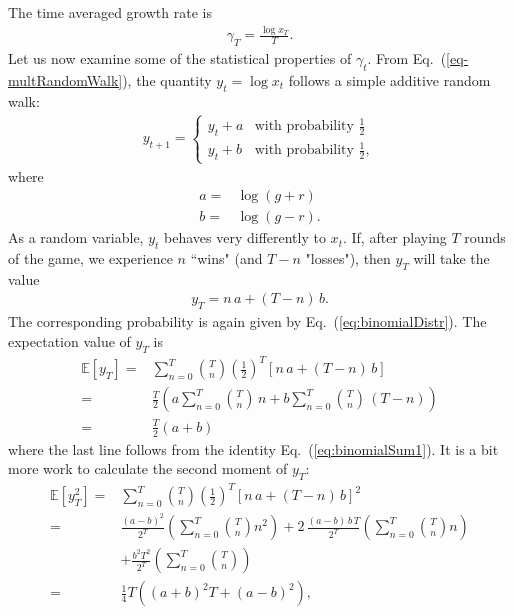 \documentclass[11pt]{article}
\begin{document}
\begin{multicols}{2}
The time averaged growth rate is
\begin{align}
\label{eq:gammaT}
\gamma_T = \frac{\log x_T}{T}.
\end{align}
Let us now examine some of the statistical properties of $\gamma_t$.
From Eq.~(\ref{eq-multRandomWalk}), the quantity $y_t = \log x_t$ follows a simple additive random walk:
\begin{align}
\label{eq-addRandomWalk}
y_{t+1} = \left\{ 
\begin{array}{ll}
y_t + a& \text{with probability $\frac{1}{2}$}\\
y_t + b  & \text{with probability $\frac{1}{2}$},
\end{array}
\right.
\end{align}
where 
\begin{align*}
a =& \log (g+r)\\
b = & \log (g-r). 
\end{align*}
As a random variable, $y_t$ behaves very differently to $x_t$.  If, after playing $T$ rounds of the game, we experience $n$ ``wins" (and $T-n$ "losses"), then $y_T$ will take the value
\begin{align*}
y_T =  n\, a + (T-n)\,b.
\end{align*}
The corresponding probability is again given by Eq.~(\ref{eq:binomialDistr}). 
The expectation value of $y_T$ is 
\begin{align}
\nonumber \mathbb{E}\left[y_T \right] =& \sum_{n=0}^T  {T \choose n} \left(\frac{1}{2}\right)^T  \left[ n\, a + (T-n)\,b \right] \\
\nonumber  = & \frac{T}{2} \left( a \sum_{n=0}^T {T \choose n} \,n + b \sum_{n=0}^T {T \choose n} \,(T-n)\right)\\
\label{eq-expectationyT}=&  \frac{T}{2} \left(a  + b \right)
\end{align}
where the last line follows from the identity Eq.~(\ref{eq:binomialSum1}).
It is a bit more work to calculate the second moment of $y_T$:
\begin{align}
\nonumber \mathbb{E}\left[y_T^2 \right] =& \sum_{n=0}^T  {T \choose n} \left(\frac{1}{2}\right)^T  \left[ n\, a + (T-n)\,b \right] ^2\\
\nonumber =& \frac{(a-b)^2}{2^T}\left( \sum_{n=0}^T  {T \choose n} n^2 \right) +  2\, \frac{(a - b)\, b\, T}{2^T} \left(\sum_{n=0}^T  {T \choose n} n \right) \\
\nonumber &  + \frac{b^2 T^2}{2^T} \left( \sum_{n=0}^T  {T \choose n} \right) \\ 
\label{eq:varianceyT} = & \frac{1}{4} T \left( (a + b)^2 T  + (a-b)^2\right),

\end{align}
\end{multicols}
\end{document}
